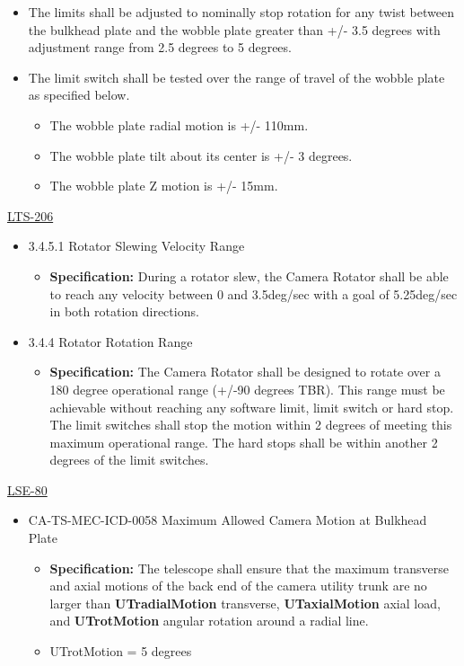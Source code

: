 \documentclass[SE,lsstdraft,authoryear,toc]{lsstdoc}
\begin{document}
\begin{itemize}
\item
  The limits shall be adjusted to nominally stop rotation for any twist
  between the bulkhead plate and the wobble plate greater than +/- 3.5
  degrees with adjustment range from 2.5 degrees to 5 degrees.
\item
  The limit switch shall be tested over the range of travel of the
  wobble plate as specified below.

  \begin{itemize}
  \item
    The wobble plate radial motion is +/- 110mm.
  \item
    The wobble plate tilt about its center is +/- 3 degrees.
  \item
    The wobble plate Z motion is +/- 15mm.
  \end{itemize}
\end{itemize}

\underline{LTS-206}

\begin{itemize}
\item
  3.4.5.1 Rotator Slewing Velocity Range

  \begin{itemize}
  \item
    \textbf{Specification:} During a rotator slew, the Camera Rotator
    shall be able to reach any velocity between 0 and 3.5deg/sec with a
    goal of 5.25deg/sec in both rotation directions.
  \end{itemize}
\item
  3.4.4 Rotator Rotation Range

  \begin{itemize}
  \item
    \textbf{Specification:} The Camera Rotator shall be designed to
    rotate over a 180 degree operational range (+/-90 degrees TBR). This
    range must be achievable without reaching any software limit, limit
    switch or hard stop. The limit switches shall stop the motion within
    2 degrees of meeting this maximum operational range. The hard stops
    shall be within another 2 degrees of the limit switches.
  \end{itemize}
\end{itemize}

\underline{LSE-80}

\begin{itemize}
\item
  CA-TS-MEC-ICD-0058 Maximum Allowed Camera Motion at Bulkhead Plate

  \begin{itemize}
  \item
    \textbf{Specification:} The telescope shall ensure that the maximum
    transverse and axial motions of the back end of the camera utility
    trunk are no larger than \textbf{UTradialMotion} transverse,
    \textbf{UTaxialMotion} axial load, and \textbf{UTrotMotion} angular
    rotation around a radial line.
  \item
    UTrotMotion = 5 degrees
  \end{itemize}
\end{itemize}
\end{document}
